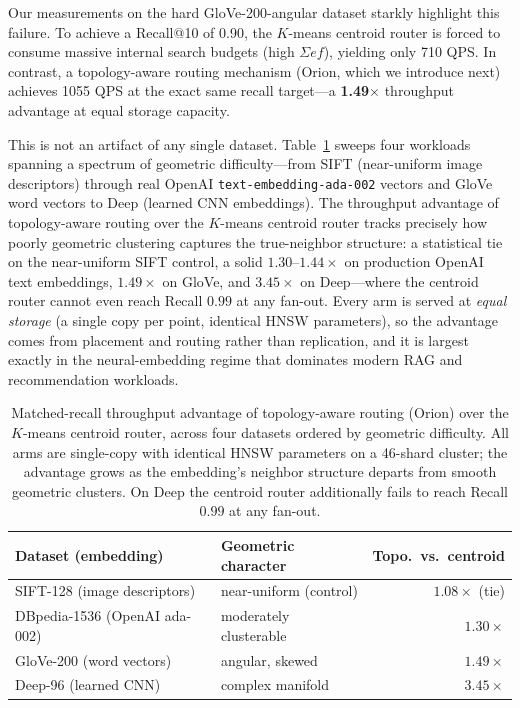 Our measurements on the hard GloVe-200-angular dataset starkly highlight this failure. To achieve a Recall@10 of 0.90, the $K$-means centroid router is forced to consume massive internal search budgets (high $\Sigma ef$), yielding only 710 QPS. In contrast, a topology-aware routing mechanism (Orion, which we introduce next) achieves 1055 QPS at the exact same recall target---a \textbf{1.49$\times$} throughput advantage at equal storage capacity.

This is not an artifact of any single dataset. Table~\ref{tab:spectrum} sweeps four workloads spanning a spectrum of geometric difficulty---from SIFT (near-uniform image descriptors) through real OpenAI \texttt{text-embedding-ada-002} vectors and GloVe word vectors to Deep (learned CNN embeddings). The throughput advantage of topology-aware routing over the $K$-means centroid router tracks precisely how poorly geometric clustering captures the true-neighbor structure: a statistical tie on the near-uniform SIFT control, a solid $1.30\text{--}1.44\times$ on production OpenAI text embeddings, $1.49\times$ on GloVe, and $3.45\times$ on Deep---where the centroid router cannot even reach Recall $0.99$ at any fan-out. Every arm is served at \emph{equal storage} (a single copy per point, identical HNSW parameters), so the advantage comes from placement and routing rather than replication, and it is largest exactly in the neural-embedding regime that dominates modern RAG and recommendation workloads.

\begin{table}[t]
\centering
\small
\begin{tabular}{@{}llr@{}}
\toprule
Dataset (embedding) & Geometric character & Topo.\ vs.\ centroid \\
\midrule
SIFT-128 (image descriptors) & near-uniform (control) & $1.08\times$ (tie) \\
DBpedia-1536 (OpenAI ada-002) & moderately clusterable & $1.30\times$ \\
GloVe-200 (word vectors) & angular, skewed & $1.49\times$ \\
Deep-96 (learned CNN) & complex manifold & $3.45\times$ \\
\bottomrule
\end{tabular}
\caption{Matched-recall throughput advantage of topology-aware routing (Orion) over the $K$-means centroid router, across four datasets ordered by geometric difficulty. All arms are single-copy with identical HNSW parameters on a 46-shard cluster; the advantage grows as the embedding's neighbor structure departs from smooth geometric clusters. On Deep the centroid router additionally fails to reach Recall $0.99$ at any fan-out.}
\label{tab:spectrum}
\end{table}

